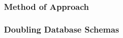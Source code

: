 \begin{frame}
    \frametitle{Method of Approach}
    \centering
    
    
\end{frame}

\begin{frame}
    \frametitle{Doubling Database Schemas}
    \centering
    
    
\end{frame}
